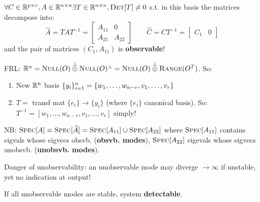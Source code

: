 \begin{Theorem}
$\forall C\in\mathbb R^{p\times r},A\in\mathbb R^{n\times n}\exists T\in\mathbb R^{n\times n}, \textsc{Det}[T]\ne 0$ s.t. in this basis the matrices decompose into:
\begin{equation*}
\widehat A=TAT^{-1}=\begin{bmatrix}
A_{11} & 0 \\
A_{21} & A_{22}
\end{bmatrix}
\qquad\widehat C=CT^{-1}=\begin{bmatrix}
C_1 & 0
\end{bmatrix}
\end{equation*}
and the pair of matrices $(C_1,A_{11})$ is \textbf{observable}!

\begin{Method}
FRL: $\mathbb R^n=\textsc{Null}(O)\overset{\perp}{\oplus}\textsc{Null}(O)^\perp=\textsc{Null}(O)\overset{\perp}{\oplus}\textsc{Range}(O^T)$. So:
\begin{enumerate}[label=\protect\circled{\arabic*},leftmargin=4mm]
  \item New $\mathbb R^n$ basis $\{y_{i}\}_{i=1}^{n}=\{w_1,\ldots,w_{n-r},v_1,\ldots,v_r\}$
  
  \item $T=$ transf mat $\{e_i\}\to\{y_i\}$ (where $\{e_i\}$ canonical basis). So:
  $T^{-1}=[w_1,\ldots,w_{n-r},v_1,\ldots,v_r]$ simply!
\end{enumerate}
\end{Method}
\begin{Definition}
NB: $\textsc{Spec}[A]\equiv\textsc{Spec}[\widehat A]=\textsc{Spec}[A_{11}]\cup\textsc{Spec}[A_{22}]$ where $\textsc{Spec}[A_{11}]$ contains eigvals whose eigvecs obsvb. (\textbf{obsvb. modes}), $\textsc{Spec}[A_{22}]$ eigevals whose eigvecs unobsvb. (\textbf{unobsvb. modes}).
\end{Definition}
\end{Theorem}
Danger of unobservability: an unobservable mode may diverge $\to\infty$ if unstable, yet no indication at output!

\begin{Definition}
If all unobservable modes are stable, system \textbf{detectable}.
\end{Definition}




